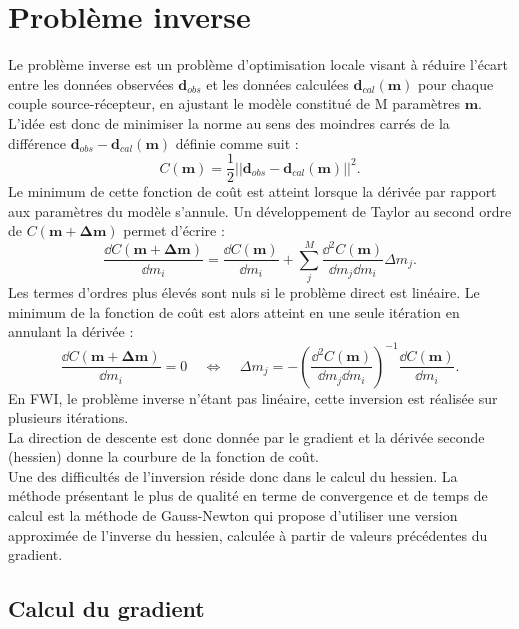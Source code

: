 \section{Problème inverse}

Le problème inverse est un problème d'optimisation locale visant à réduire l'écart entre les données observées $\bm{d}_{obs}$ et les données calculées $\bm{d}_{cal}(\bm{m})$ pour chaque couple source-récepteur, en ajustant le modèle constitué de M paramètres $\bm{m}$. L'idée est donc de minimiser la norme au sens des moindres carrés de la différence $\bm{d}_{obs}-\bm{d}_{cal}(\bm{m})$ définie comme suit : 
\begin{equation}
	C(\bm{m})=\frac{1}{2}||\bm{d}_{obs}-\bm{d}_{cal}(\bm{m})||^{2}\text{.}
	\label{norm}
\end{equation}
 Le minimum de cette fonction de coût est atteint lorsque la dérivée par rapport aux paramètres du modèle s'annule. Un développement de Taylor au second ordre de $C(\bm{m}+ \bm{\Delta m})$  permet d'écrire : 
 \begin{equation}
 	\frac{\dd C(\bm{m}+\bm{\Delta m})}{\dd m_{i}}= \frac{\dd C(\bm{m})}{\dd m_{i}} + \displaystyle\sum_{j}^{M} \frac{\dd^{2} C(\bm{m})}{\dd m_{j} \dd m_{i}}\Delta m_{j}\text{.}
 \end{equation}
Les termes d'ordres plus élevés sont nuls si le problème direct est linéaire. Le minimum de la fonction de coût est alors atteint en une seule itération en annulant la dérivée : 
\begin{equation}
	\frac{\dd C(\bm{m}+\bm{\Delta m})}{\dd m_{i}} = 0 ~~~~~\Leftrightarrow ~~~~~ \Delta m _{j} = -\left( \frac{\dd ^{2} C(\bm{m})}{\dd m_{j} \dd m_{i} }\right)^{-1} \frac{\dd C (\bm{m})}{\dd m_{i}} \text{.}
\end{equation}
En FWI, le problème inverse n'étant pas linéaire, cette inversion est réalisée sur plusieurs itérations.\\
La direction de descente est donc donnée par le gradient et la dérivée seconde (hessien) donne la courbure de la fonction de coût.\\

Une des difficultés de l'inversion réside donc dans le calcul du hessien. La méthode présentant le plus de qualité en terme de convergence et de temps de calcul est la méthode de Gauss-Newton qui propose d'utiliser une version approximée de l'inverse du hessien, calculée à partir de valeurs précédentes du gradient.

\subsection{Calcul du gradient}

